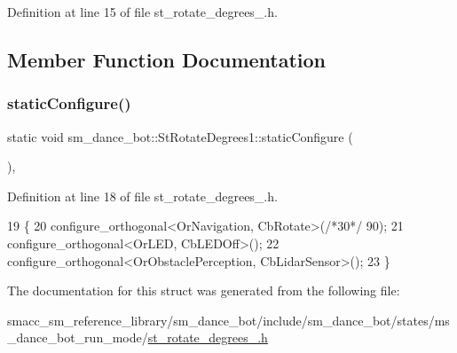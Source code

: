 Definition at line 15 of file st\+\_\+rotate\+\_\+degrees\+\_.\+h.



\subsection{Member Function Documentation}
\mbox{\label{structsm__dance__bot_1_1StRotateDegrees1_a7028b1f5edf51f6fbc80886c1149cec4}} 
\subsubsection{\texorpdfstring{static\+Configure()}{staticConfigure()}}
{\footnotesize\ttfamily static void sm\+\_\+dance\+\_\+bot\+::\+St\+Rotate\+Degrees1\+::static\+Configure (\begin{DoxyParamCaption}{ }\end{DoxyParamCaption})\hspace{0.3cm}{\ttfamily [inline]}, {\ttfamily [static]}}



Definition at line 18 of file st\+\_\+rotate\+\_\+degrees\+\_.\+h.


\begin{DoxyCode}
19   \{
20     configure\_orthogonal<OrNavigation, CbRotate>(\textcolor{comment}{/*30*/} 90);
21     configure\_orthogonal<OrLED, CbLEDOff>();
22     configure\_orthogonal<OrObstaclePerception, CbLidarSensor>();
23   \}
\end{DoxyCode}


The documentation for this struct was generated from the following file\+:\begin{DoxyCompactItemize}
\item 
smacc\+\_\+sm\+\_\+reference\+\_\+library/sm\+\_\+dance\+\_\+bot/include/sm\+\_\+dance\+\_\+bot/states/ms\+\_\+dance\+\_\+bot\+\_\+run\+\_\+mode/\hyperlink{st__rotate__degrees__1_8h}{st\+\_\+rotate\+\_\+degrees\+\_.\+h}\end{DoxyCompactItemize}
